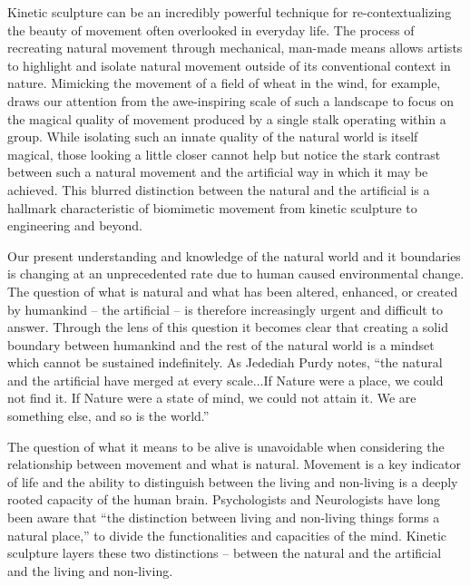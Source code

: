\documentclass[letterpaper]{article}
\begin{document}


Kinetic sculpture can be an incredibly powerful technique for re-contextualizing the beauty of movement often overlooked in everyday life. The process of recreating natural movement through mechanical, man-made means allows artists to highlight and isolate natural movement outside of its conventional context in nature. Mimicking the movement of a field of wheat in the wind, for example, draws our attention from the awe-inspiring scale of such a landscape to focus on the magical quality of movement produced by a single stalk operating within a group. While isolating such an innate quality of the natural world is itself magical, those looking a little closer cannot help but notice the stark contrast between such a natural movement and the artificial way in which it may be achieved. This blurred distinction between the natural and the artificial is a hallmark characteristic of biomimetic movement from kinetic sculpture to engineering and beyond. 

Our present understanding and knowledge of the natural world and it boundaries is changing at an unprecedented rate due to human caused environmental change. The question of what is natural and what has been altered, enhanced, or created by humankind -- the artificial -- is therefore increasingly urgent and difficult to answer. Through the lens of this question it becomes clear that creating a solid boundary between humankind and the rest of the natural world is a mindset which cannot be sustained indefinitely.\cite{smith} As Jedediah Purdy notes, ``the natural and the artificial have merged at every scale...If Nature were a place, we could not find it. If Nature were a state of mind, we could not attain it. We are something else, and so is the world.''\cite{purdy}

The question of what it means to be alive is unavoidable when considering the relationship between movement and what is natural. Movement is a key indicator of life and the ability to distinguish between the living and non-living is a deeply rooted capacity of the human brain. Psychologists and Neurologists have long been aware that ``the distinction between living and non-living things forms a natural place,'' to divide the functionalities and capacities of the mind.\cite{narine} Kinetic sculpture layers these two distinctions -- between the natural and the artificial and the living and non-living.   
\end{document}
